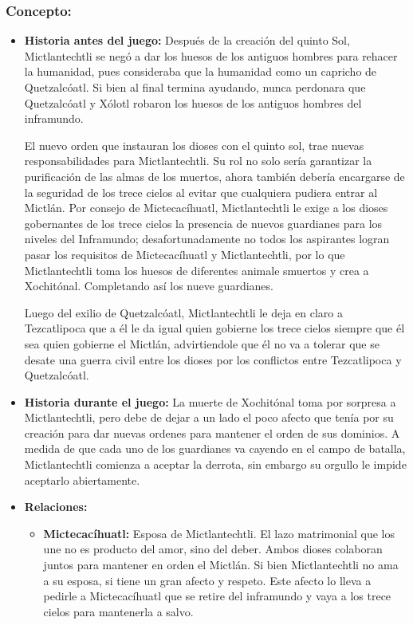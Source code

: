 \documentclass[11pt,letterpaper]{article}
\begin{document}
\subsubsection{Concepto:}
\begin{itemize}
	\item \textbf{Historia antes del juego:}
	Después de la creación del quinto Sol,  Mictlantechtli se negó a dar los huesos de los antiguos hombres para rehacer la humanidad, pues consideraba que la humanidad como un capricho de Quetzalcóatl. Si bien al final termina ayudando, nunca perdonara que Quetzalcóatl y Xólotl robaron los huesos de los antiguos hombres del inframundo.
	\\
	\par
	El nuevo orden que instauran los dioses con el quinto sol, trae nuevas responsabilidades para  Mictlantechtli. Su rol no solo sería garantizar la purificación de las almas de los muertos, ahora también debería encargarse de la seguridad de los trece cielos al evitar que cualquiera pudiera entrar al Mictlán. Por consejo de  Mictecacíhuatl,  Mictlantechtli le exige a los dioses gobernantes de los trece cielos la presencia de nuevos guardianes para los niveles del Inframundo; desafortunadamente no todos los aspirantes logran pasar los requisitos de Mictecacíhuatl y  Mictlantechtli, por lo que Mictlantechtli toma los huesos de diferentes animale smuertos y crea a Xochitónal. Completando así los nueve guardianes.
	\\
	\par
	Luego del exilio de Quetzalcóatl, Mictlantechtli le deja en claro a Tezcatlipoca que a él le da igual quien gobierne los trece cielos siempre que él sea quien gobierne el Mictlán, advirtiendole que él no va a tolerar que se desate una guerra civil entre los dioses por los conflictos entre Tezcatlipoca y Quetzalcóatl. 
	\item \textbf{Historia durante el juego:}
	La muerte de Xochitónal toma por sorpresa a Mictlantechtli, pero debe de dejar a un lado el poco afecto que tenía por su creación para dar nuevas ordenes para mantener el orden de sus dominios. A medida de que cada uno de los guardianes va cayendo en el campo de batalla,  Mictlantechtli comienza a aceptar la derrota, sin embargo su orgullo le impide aceptarlo abiertamente. 
	\item \textbf{Relaciones:}
	\begin{itemize}
		\item \textbf{Mictecacíhuatl:} Esposa de Mictlantechtli. El lazo matrimonial que los une no es producto del amor, sino del deber. Ambos dioses colaboran juntos para mantener en orden el Mictlán. Si bien Mictlantechtli no ama a su esposa, si tiene un gran afecto y respeto. Este afecto lo lleva a pedirle a  Mictecacíhuatl que se retire del inframundo y vaya a los trece cielos para mantenerla a salvo.

\end{itemize}
\end{itemize}
\end{document}
